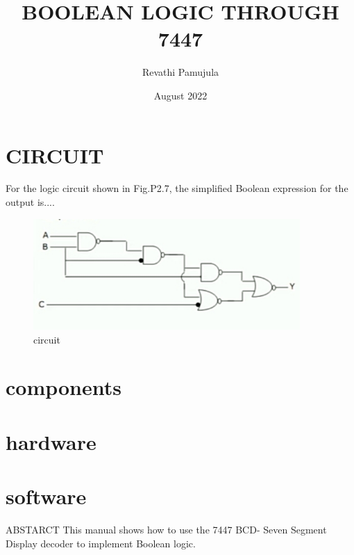 \documentclass{article}
\title{BOOLEAN LOGIC THROUGH 7447}
\author{Revathi Pamujula}
\date{August 2022}
\begin{document}
\maketitle

\section{CIRCUIT}

For the logic circuit shown in Fig.P2.7, the simplified Boolean expression for the output is....\\
\begin{figure}
    \centering
    \includegraphics[width=4in]{boolean.jpg}
    \caption{circuit}
    \label{fig:circuit}
\end{figure}
\section{components}
\section{hardware}
\section{software}
ABSTARCT This manual shows how to use the 7447 BCD-
Seven Segment Display decoder to implement Boolean logic.
\end{document}

